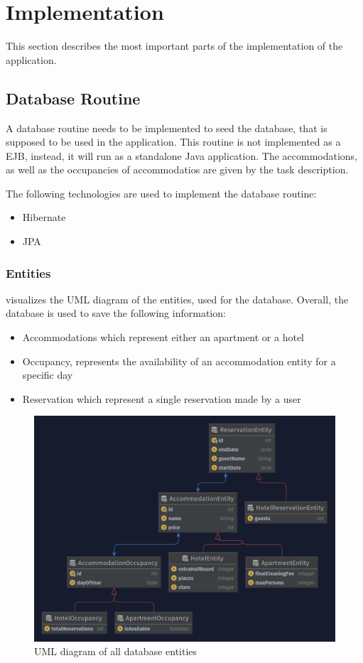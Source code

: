 \section{Implementation}\label{sec:02_impl}
This section describes the most important parts of the implementation of the application.


\subsection{Database Routine}
A database routine needs to be implemented to seed the database, that is supposed to be used in the application.
This routine is not implemented as a EJB, instead, it will run as a standalone Java application.
The accommodations, as well as the occupancies of accommodatios are given by the task description.

The following technologies are used to implement the database routine:
\begin{itemize}
\item Hibernate
\item JPA
\end{itemize}

\subsubsection{Entities}
 visualizes the UML diagram of the entities, used for the database.
Overall, the database is used to save the following information:
\begin{itemize}
\item Accommodations which represent either an apartment or a hotel
\item Occupancy, represents the availability of an accommodation entity for a specific day
\item Reservation which represent a single reservation made by a user
\end{itemize}

\begin{figure}[h]
\centering
\includegraphics[scale=0.3]{images/02_impl/entities}
\caption{UML diagram of all database entities}
\label{fig:subsubsec:02_impl_db_entities}
\end{figure}

